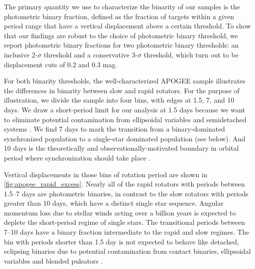 \documentclass[manuscript]{aastex6}
\begin{document}
The primary quantity we use to characterize the binarity of our samples is the
photometric binary fraction, defined as the fraction of targets within a given
period range that have a vertical displacement above a certain threshold.
To show that our findings are robust to the choice of photometric
binary threshold, we report photometric binary fractions for two photometric 
binary thresholds: an inclusive 2-\(\sigma\) threshold and a conservative 
3-\(\sigma\) threshold, which turn out to be displacement cuts of 0.2 and 0.3 
mag. 

\begin{figure*}[htb]
    \centering
    \caption{\emph{Top Left to Bottom Right:} Vertical displacement of cool 
        APOGEE targets with \citet{McQuillan14} periods >10 days, between 
        7--10 days, 1.5--7 days, and <1.5 days. Pink stars denote 
        eclipsing binaries with orbital periods within the same ranges. The 
        green and purple lines denote the inclusive and conservative 
        photometric binary thresholds, respectively. The temperatures are from
    APOGEE.}\label{fig:apogee_rapid_excess}
\end{figure*}

For both binarity thresholds, the well-characterized APOGEE sample 
illustrates the differences in binarity between slow and rapid rotators. For
the purpose of illustration, we divide the sample into four bins, with edges at 
1.5, 7, and 10 days. We draw a short-period limit for our analysis at 1.5 days 
because we want to eliminate potential contamination from ellipsoidal variables 
and semidetached systems \citep{VanEylen16}. We find 7 days to mark the
transition from a binary-dominated synchronized population to a single-star
dominated population (see below). And 10 days is the theoretically and
observationally-motivated boundary in orbital period where synchronization
should take place \citep{Claret97,Lurie17}.

Vertical displacements in those bins of rotation period are shown in
\cref{fig:apogee_rapid_excess}. Nearly all of the rapid rotators with periods 
between 1.5--7 days are photometric binaries, in contrast to the slow rotators
with periods greater than 10 days, which have a distinct single star sequence. 
Angular momentum loss due to stellar winds acting over a billion years is
expected to deplete the short-period regime of single stars. The transitional 
periods between 7--10 days have a binary fraction intermediate to the 
rapid and slow regimes. The bin with periods shorter than 1.5 day is not expected
to behave like detached, eclipsing binaries due to potential contamination from 
contact binaries, ellipsoidal variables and blended pulsators \citep{VanEylen16}. 
\end{document}
